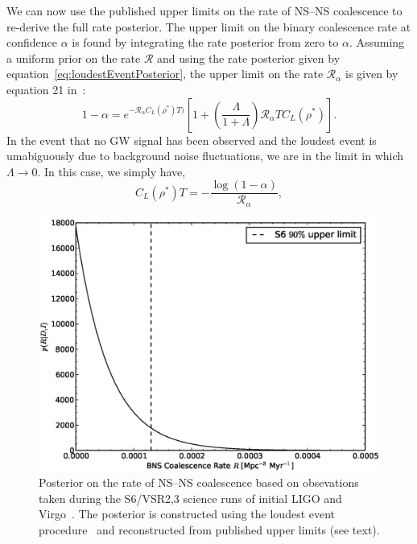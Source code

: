 \documentclass[twocolumn,nofootinbib]{revtex4-1}
\newcommand{\cbcrate}{{{\mathcal R}}}
\newcommand{\rhostar}{{\rho^*}}
\newcommand{\BNS}{\ac{NS}--\ac{NS}\xspace}
\begin{document}
We can now use the published upper limits on the rate of \BNS coalescence to re-derive the full rate posterior.
The upper limit on the binary coalescence rate at confidence $\alpha$ is found by integrating the rate posterior from zero to $\alpha$.
Assuming a uniform prior on the rate $\cbcrate$ and using the rate posterior given by equation~\ref{eq:loudestEventPosterior}, the upper limit on the rate $\cbcrate_{\alpha}$ is given by equation 21 in~\cite{BradyFairhurst08}:
%
\begin{equation}
1-\alpha =  e^{-\cbcrate_{\alpha} C_L(\rhostar)T)}
\left[ 
1+ \left(\frac{\Lambda}{1+\Lambda}\right) \cbcrate_{\alpha} T C_L(\rhostar)
\right ].
\label{eq:rateIntegral}
\end{equation}
%
In the event that no \ac{GW} signal has been observed and the loudest event is umabiguously due to background noise fluctuations, we are in the limit in which $\Lambda \rightarrow 0$.
In this case, we simply have,
\begin{equation}
C_L(\rhostar)T = -\frac{\log(1-\alpha)}{\cbcrate_{\alpha}},
\end{equation}
%
%

\begin{figure}
\centering
\includegraphics[width=\linewidth]{S6_rate.eps}
\caption{Posterior on the rate of \BNS coalescence based on obsevations taken during the S6/VSR2,3 science runs of initial LIGO and Virgo~\cite{S6lowmass}.
    The posterior is constructed using the loudest event procedure~\cite{Biswas09,BradyFairhurst08} and reconstructed from published upper limits (see text).
    \label{fig:s6rate}}
\end{figure}
\end{document}
